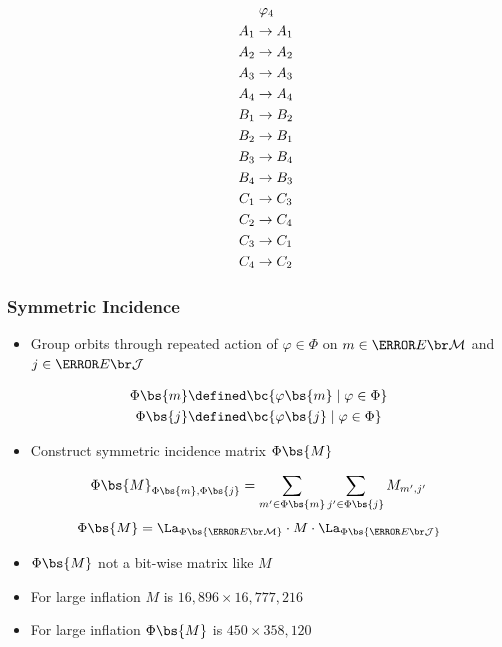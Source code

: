 \documentclass[
    hyperref={bookmarks=false},%
    xcolor={dvipsnames},
]{beamer}
\renewcommand{\term}[1]{\textcolor{Mahogany}{#1}}
\renewcommand{\tcdot}{\cdot} %
\begin{document}
\begin{frame}
\begin{equation*}
\begin{aligned}[c]
    \end{aligned}
    \quad
    \begin{aligned}[c]
    &\hspace{1mm}\varphi_4 \\
    A_1 &\to A_1 \\A_2 &\to A_2 \\A_3 &\to A_3 \\A_4 &\to A_4 \\B_1 &\to B_2 \\B_2 &\to B_1 \\B_3 &\to B_4 \\B_4 &\to B_3 \\C_1 &\to C_3 \\C_2 &\to C_4 \\C_3 &\to C_1 \\C_4 &\to C_2
    \end{aligned}
    \end{equation*}
\end{frame}

\begin{frame}
    \frametitle{Symmetric Incidence}
    \begin{itemize}
        \item Group orbits through repeated action of $\varphi \in \Phi$ on $m \in \Events{\mscenario}$ and $j \in \Events{\jointvar}$
    \end{itemize}
    \begin{align*}
        \Phi\bs{m} &\defined \bc{\varphi\bs{m} \mid \varphi \in \Phi} \\
        \Phi\bs{j} &\defined \bc{\varphi\bs{j} \mid \varphi \in \Phi}
    \end{align*}
    \begin{itemize}
        \item Construct \term{symmetric incidence matrix} $\Phi\bs{M}$
    \end{itemize}
    \[ \Phi\bs{M}_{\Phi\bs{m}, \Phi\bs{j}} = \sum_{m' \in \Phi\bs{m}}\sum_{j' \in \Phi\bs{j}} M_{m',j'} \]
    \[ \Phi\bs{M} = \La_{\Phi\bs{\Events{\mscenario}}}\tcdot M \tcdot \La_{\Phi\bs{\Events{\jointvar}}} \]
    \begin{itemize}
        \item $\Phi\bs{M}$ not a bit-wise matrix like $M$
        \item For large inflation $M$ is $16,896 \times 16,777,216$
        \item For large inflation $\Phi\bs{M}$ is $450 \times 358,120$ %
    \end{itemize}
\end{frame}
\end{document}

